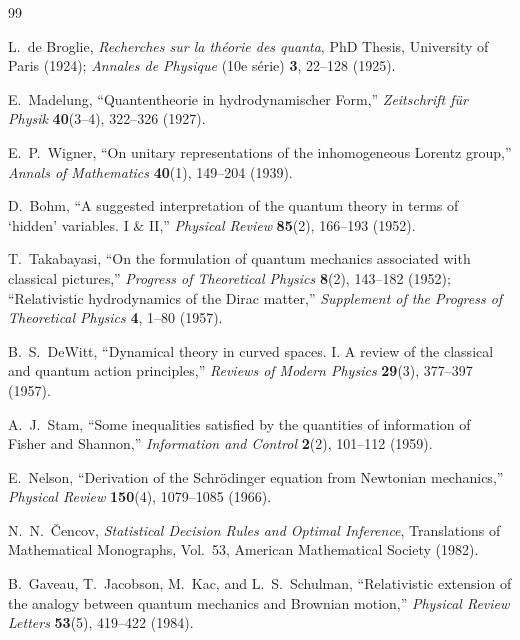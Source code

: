 \documentclass[11pt, a4paper]{article}
\theoremstyle{definition}
\begin{document}
\FloatBarrier
\begin{thebibliography}{99}
\small
\setlength{\itemsep}{2pt plus 1pt minus 1pt}

L.~de Broglie, \textit{Recherches sur la th\'{e}orie des quanta}, PhD Thesis, University of Paris (1924); \textit{Annales de Physique} (10e s\'{e}rie) \textbf{3}, 22--128 (1925).

E.~Madelung, ``Quantentheorie in hydrodynamischer Form,'' \textit{Zeitschrift f\"{u}r Physik} \textbf{40}(3--4), 322--326 (1927).

E.~P.~Wigner, ``On unitary representations of the inhomogeneous Lorentz group,'' \textit{Annals of Mathematics} \textbf{40}(1), 149--204 (1939).

D.~Bohm, ``A suggested interpretation of the quantum theory in terms of `hidden' variables. I \& II,'' \textit{Physical Review} \textbf{85}(2), 166--193 (1952).

T.~Takabayasi, ``On the formulation of quantum mechanics associated with classical pictures,'' \textit{Progress of Theoretical Physics} \textbf{8}(2), 143--182 (1952); ``Relativistic hydrodynamics of the Dirac matter,'' \textit{Supplement of the Progress of Theoretical Physics} \textbf{4}, 1--80 (1957).

B.~S.~DeWitt, ``Dynamical theory in curved spaces. I. A review of the classical and quantum action principles,'' \textit{Reviews of Modern Physics} \textbf{29}(3), 377--397 (1957).

A.~J.~Stam, ``Some inequalities satisfied by the quantities of information of Fisher and Shannon,'' \textit{Information and Control} \textbf{2}(2), 101--112 (1959).

E.~Nelson, ``Derivation of the Schr\"{o}dinger equation from Newtonian mechanics,'' \textit{Physical Review} \textbf{150}(4), 1079--1085 (1966).

N.~N.~\v{C}encov, \textit{Statistical Decision Rules and Optimal Inference}, Translations of Mathematical Monographs, Vol.~53, American Mathematical Society (1982).

B.~Gaveau, T.~Jacobson, M.~Kac, and L.~S.~Schulman, ``Relativistic extension of the analogy between quantum mechanics and Brownian motion,'' \textit{Physical Review Letters} \textbf{53}(5), 419--422 (1984).


\end{thebibliography}
\end{document}
